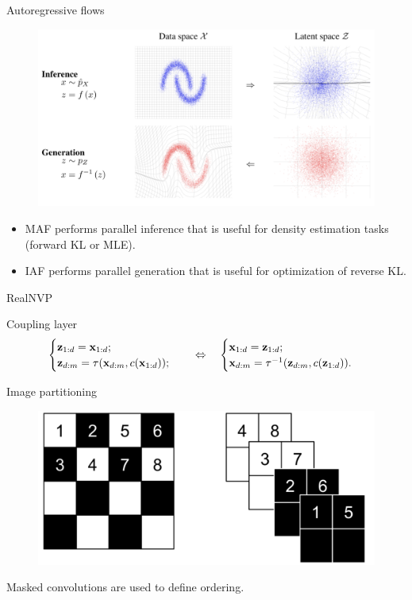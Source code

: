 \begin{frame}{Autoregressive flows}
	\begin{figure}
		\includegraphics[width=0.8\linewidth]{figs/flows_how2.png}
	\end{figure}
	\begin{itemize}	
		\item MAF performs parallel inference that is useful for density estimation tasks (forward KL or MLE).
		\item IAF performs parallel generation that is useful for optimization of reverse KL.
	\end{itemize}
	
\end{frame}
\begin{frame}{RealNVP}
	\begin{block}{Coupling layer}
		\vspace{-0.8cm}
		\begin{equation*}
			\begin{cases} \mathbf{z}_{1:d} = \mathbf{x}_{1:d}; \\ \mathbf{z}_{d:m} = \tau (\mathbf{x}_{d:m}, c(\mathbf{x}_{1:d}));\end{cases} 
			\quad \Leftrightarrow \quad 
			\begin{cases} \mathbf{x}_{1:d} = \mathbf{z}_{1:d}; \\ \mathbf{x}_{d:m} = \tau^{-1} (\mathbf{z}_{d:m}, c(\mathbf{z}_{1:d})).\end{cases}
		\end{equation*}
		\vspace{-0.5cm}
	\end{block}
	\begin{block}{Image partitioning}
		\begin{figure}
			\centering
			\includegraphics[width=0.65\linewidth]{figs/realnvp_masking.png}
		\end{figure}
	\end{block}
	Masked convolutions are used to define ordering.
	
\end{frame}
